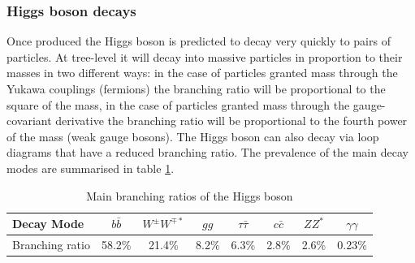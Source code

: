 \subsubsection{Higgs boson decays}
Once produced the Higgs boson is predicted to decay very quickly to pairs of particles. At tree-level it will decay into massive particles in proportion to their masses in two different ways: in the case of particles granted mass through the Yukawa couplings (fermions) the branching ratio will be proportional to the square of the mass, in the case of particles granted mass through the gauge-covariant derivative the branching ratio will be proportional to the fourth power of the mass (weak gauge bosons). 
The Higgs boson can also decay via loop diagrams that have a reduced branching ratio. The prevalence of the main decay modes are summarised in table \ref{tab:theory:higgs_branching_ratios}.
\begin{table}[h!]
\begin{tabular}{ l | c | c | c | c | c | c | c}
    Decay Mode & $b\bar{b}$ & $W^{\pm}W^{\mp*}$ & $gg$ & $\tau\bar{\tau}$ & $c\bar{c}$ & $ZZ^{*}$ & $\gamma\gamma$ \\
    \hline
    Branching ratio & 58.2\% & 21.4\% & 8.2\% & 6.3\% & 2.8\% & 2.6\% & 0.23\% \\
\end{tabular}
\caption{Main branching ratios of the Higgs boson}
 \label{tab:theory:higgs_branching_ratios}
\end{table}

